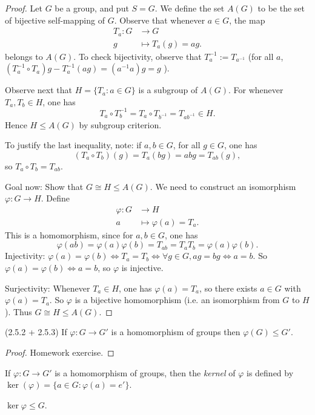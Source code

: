 \begin{proof}
	Let $G$ be a group, and put $S = G$. We define the set $A(G)$ to be the set of bijective self-mapping of $G$. Observe that whenever $a \in G$, the map 
	\begin{align*}
		T_a: G &\longrightarrow G \\
		g &\longmapsto T_a(g) = ag
	.\end{align*}
	belongs to $A(G)$. To check bijectivity, observe that $T_a^{-1} := T_{a^{-1}}$ (for all $a$, $(T_a^{-1} \circ T_a)g - T_a^{-1}(ag) = (a^{-1} a)g = g$ ).

	Observe next that $H=\{T_a: a \in G\} $ is a subgroup of $A(G ) $. For whenever $T_a, T_b \in H$, one has \[
		T_a \circ T_b^{-1} = T_{a} \circ T_{b^{-1} }=T_{ab^{-1} } \in H
	.\] 
	Hence $H \le A(G)$ by subgroup criterion.

	To justify the last inequality, note: if $a,b \in G$, for all $g\in G$, one has \[
		(T_a \circ T_b)(g) = T_a(bg) = abg=T_{ab }(g)
	,\]  
	so $T_a \circ T_b = T_{ab }$.

	Goal now: Show that $G \cong H \le  A(G)$.
	We need to construct an isomorphism $\varphi:G \to H$. Define 
	\begin{align*}
		\varphi: G &\longrightarrow H \\
		a &\longmapsto \varphi(a) = T_a
	.\end{align*}
	This is a homomorphism, since for $a,b \in G$, one has  \[
		\varphi(ab) = \varphi(a)\varphi(b) =T_{ab }= T_a T_b = \varphi(a)\varphi(b)
	.\] 
	Injectivity: $\varphi(a) = \varphi(b) \iff T_a = T_b \iff \forall g \in G, ag=bg \iff a = b$.
	So $\varphi(a) = \varphi(b) \iff a = b$, so $\varphi$ is injective.

	Surjectivity: Whenever $T_a \in H$, one has $\varphi(a) = T_a$, so there exists $a \in G$ with $\varphi(a)=T_a$. So $\varphi$ is a bijective homomorphism (i.e. an isomorphism from $G$ to $H $). 
Thus $G \cong H \le A(G)$.
\end{proof}

\begin{lemma}
	(2.5.2 + 2.5.3) If $\varphi:G \to  G'$ is a homomorphism of groups then $\varphi(G)\le G'$.
\end{lemma}
\begin{proof}
	Homework exercise.
\end{proof}

\begin{definition}
	If $\varphi:G \to  G'$ is a homomorphism of groups, then the \textit{kernel} of $\varphi$ is defined by $\operatorname{ker} (\varphi) = \{a \in G: \varphi(a)=e'\}$.
\end{definition}

\begin{fact}
	$\operatorname{ker}\varphi \le G$.
\end{fact}

